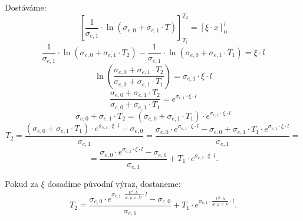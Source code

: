 \documentclass{article}
\begin{document}
Dostáváme:
$$
    \left[ \frac{1}{\sigma_{e,1}} \cdot \ln \left( \sigma_{e,0} + \sigma_{e,1} \cdot T \right) \right]_{T_1}^{T_2} = \left[ \xi \cdot x \right]_0^l
$$
$$
    \frac{1}{\sigma_{e,1}} \cdot \ln \left( \sigma_{e,0} + \sigma_{e,1} \cdot T_2 \right) - \frac{1}{\sigma_{e,1}} \cdot \ln \left( \sigma_{e,0} + \sigma_{e,1} \cdot T_1 \right) = \xi \cdot l
$$
$$
    \ln \left( \frac{\sigma_{e,0} + \sigma_{e,1} \cdot T_2}{\sigma_{e,0} + \sigma_{e,1} \cdot T_1} \right) = \sigma_{e,1} \cdot \xi \cdot l
$$
$$
    \frac{\sigma_{e,0} + \sigma_{e,1} \cdot T_2}{\sigma_{e,0} + \sigma_{e,1} \cdot T_1} = e^{\sigma_{e,1} \cdot \xi \cdot l}
$$
$$
    \sigma_{e,0} + \sigma_{e,1} \cdot T_2 = \left( \sigma_{e,0} + \sigma_{e,1} \cdot T_1 \right) \cdot e^{\sigma_{e,1} \cdot \xi \cdot l}
$$
$$
    T_2 = \frac{\left( \sigma_{e,0} + \sigma_{e,1} \cdot T_1 \right) \cdot e^{\sigma_{e,1} \cdot \xi \cdot l} - \sigma_{e,0}}{\sigma_{e,1}} = \frac{\sigma_{e,0} \cdot e^{\sigma_{e,1} \cdot \xi \cdot l} - \sigma_{e,0} + \sigma_{e,1} \cdot T_1 \cdot e^{\sigma_{e,1} \cdot \xi \cdot l}}{\sigma_{e,1}} =
$$
$$
    = \frac{\sigma_{e,0} \cdot e^{\sigma_{e,1} \cdot \xi \cdot l} - \sigma_{e,0}}{\sigma_{e,1}} + T_1 \cdot e^{\sigma_{e,1} \cdot \xi \cdot l}.
$$

Pokud za $\xi$ dosadíme původní výraz, dostaneme:
$$
    T_2 = \frac{\sigma_{e,0} \cdot e^{\sigma_{e,1} \cdot \frac{U^2 \cdot b}{d \cdot \rho \cdot c \cdot \dot{V}} \cdot l} - \sigma_{e,0}}{\sigma_{e,1}} + T_1 \cdot e^{\sigma_{e,1} \cdot \frac{U^2 \cdot b}{d \cdot \rho \cdot c \cdot \dot{V}} \cdot l}.
$$
\end{document}

